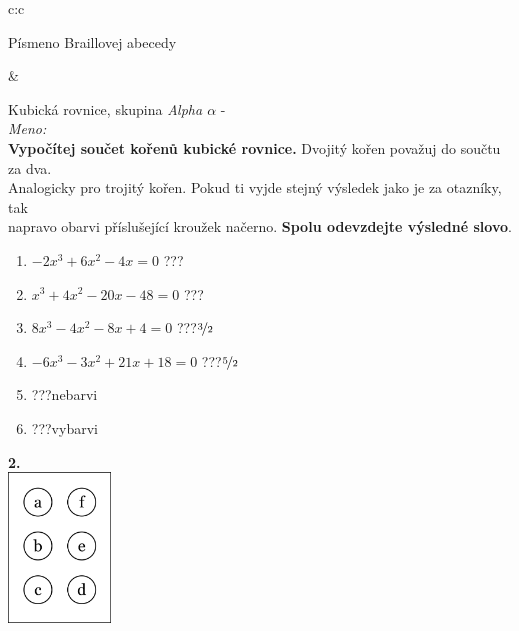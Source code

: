 \documentclass[10pt]{report}
\begin{document}
\begin{tabular}{c:c}
\begin{minipage}[c][99mm][t]{0.49\linewidth}
\begin{center}
\begin{minipage}{0.20\linewidth}
\begin{center}
{\small Písmeno Braillovej abecedy}
\end{center}
\end{minipage}
\end{center}
\end{minipage}
&
\begin{minipage}[c][99mm][t]{0.49\linewidth}
\begin{center}
\vspace{7mm}
{\huge Kubická rovnice, skupina \textit{Alpha $\alpha$} -}\\[4.5mm]
\textit{Meno:}\phantom{xxxxxxxxxxxxxxxxxxxxxxxxxxxxxxxxxxxxxxxxxxxxxxxxxxxxxxxxxxxxxxxxx}\\[3.5mm]
\textbf{Vypočítej součet kořenů kubické rovnice.} Dvojitý kořen považuj do součtu za dva.\\Analogicky pro trojitý kořen. Pokud ti vyjde stejný výsledek jako je za otazníky, tak\\napravo obarvi příslušející kroužek načerno. \textbf{Spolu odevzdejte výsledné slovo}.\\[3mm]
\begin{minipage}{0.77\linewidth}
\begin{center}
\begin{varwidth}{\textwidth}
\begin{enumerate}
\large
\item $-2x^3+6x^2-4x=0$\quad \dotfill\; ???\;\dotfill {}
\item $x^3+4x^2-20x-48=0$\quad \dotfill\; ???\;\dotfill {}
\item $8x^3-4x^2-8x+4=0$\quad \dotfill\; ???\;\dotfill \quad $\nicefrac{3}{2}$
\item $-6x^3-3x^2+21x+18=0$\quad \dotfill\; ???\;\dotfill \quad $\nicefrac{5}{2}$
\item \quad \dotfill\; ???\;\dotfill \quad nebarvi
\item \quad \dotfill\; ???\;\dotfill \quad vybarvi
\end{enumerate}
\end{varwidth}
\end{center}
\end{minipage}
\begin{minipage}{0.20\linewidth}
\begin{center}
{\Huge\bfseries 2.} \\[2mm]
\includegraphics[height=40mm]{../images/braille.png}

\end{center}
\end{minipage}
\end{center}
\end{minipage}
\end{tabular}
\end{document}
